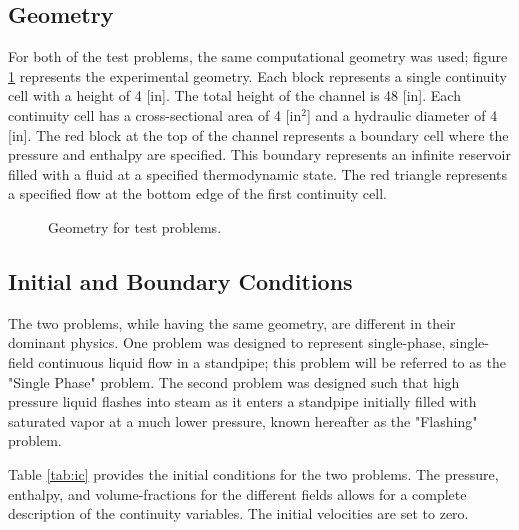 \subsection{Geometry}
\label{subsect:experimental_geometry}
For both of the test problems, the same computational geometry was used; figure \ref{fig:exp_geometry} represents the experimental geometry.
Each block represents a single continuity cell with a height of 4 [in].
The total height of the channel is 48 [in].
Each continuity cell has a cross-sectional area of 4 [in$^2$] and a hydraulic diameter of 4 [in].
The red block at the top of the channel represents a boundary cell where the pressure and enthalpy are specified.
This boundary represents an infinite reservoir filled with a fluid at a specified thermodynamic state.
The red triangle represents a specified flow at the bottom edge of the first continuity cell. 
\begin{figure}[h!t]
\caption{Geometry for test problems.}
\label{fig:exp_geometry}
\begin{center}
\end{center}
\end{figure}

\subsection{Initial and Boundary Conditions}
\label{subsect:ic_bc}

The two problems, while having the same geometry, are different in their dominant physics.
One problem was designed to represent single-phase, single-field continuous liquid flow in a standpipe; this problem will be referred to as the "Single Phase" problem.
The second problem was designed such that high pressure liquid flashes into steam as it enters a standpipe initially filled with saturated vapor at a much lower pressure, known hereafter as the "Flashing" problem.

Table \ref{tab:ic} provides the initial conditions for the two problems.
The pressure, enthalpy, and volume-fractions for the different fields allows for a complete description of the continuity variables.
The initial velocities are set to zero.


